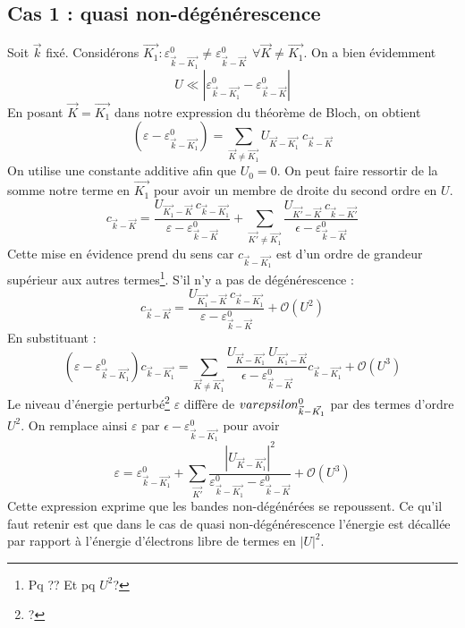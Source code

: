 		\subsection{Cas 1 : quasi non-dégénérescence}
		Soit $\vec{k}$ fixé. Considérons $\vec{K_1} : \varepsilon_{\vec{k}-
		\vec{K_1}}^0 \neq \varepsilon_{\vec{k}-\vec{K}}^0\ \ \forall\vec{K}
		\neq \vec{K_1}$. On a bien évidemment
		\begin{equation}
		U \ll |\varepsilon_{\vec{k}-\vec{K_1}}^0-\varepsilon_{\vec{k}-\vec{K}}^0|
		\end{equation}
		En posant $\vec{K}=\vec{K_1}$ dans notre expression du théorème de 
		Bloch, on obtient
		\begin{equation}
		\left(\varepsilon-\varepsilon_{\vec{k}-\vec{K_1}}^0\right) = 
		\sum_{\vec{K}\neq\vec{K_1}} U_{\vec{K}-\vec{K_1}}\ c_{\vec{k}-\vec{K}}
		\end{equation}
		On utilise une constante additive afin que $U_0=0$. On peut faire 
		ressortir de la somme notre terme en $\vec{K_1}$ pour avoir un membre 
		de droite du second ordre en $U$.
		\begin{equation}
		c_{\vec{k}-\vec{K}} = \dfrac{U_{\vec{K_1}-\vec{K}}\ c_{\vec{k}-\vec{K_1}}}{
		\varepsilon-\varepsilon_{\vec{k}-\vec{K}}^0} + \sum_{\vec{K'}\neq\vec{K_1}}
		\dfrac{U_{\vec{K'}-\vec{K}}\ c_{\vec{k}-\vec{K'}}}{\epsilon - \varepsilon_{\vec{k}-
		\vec{K}}^0}
		\end{equation}
		Cette mise en évidence prend du sens car $c_{\vec{k}-\vec{K_1}}$ est d'un 
		ordre de grandeur supérieur aux autres termes\footnote{Pq ?? Et pq $U^2$?}. 
		S'il n'y a pas de dégénérescence :
		\begin{equation}
		c_{\vec{k}-\vec{K}} = \dfrac{U_{\vec{K_1}-\vec{K}}\ c_{\vec{k}-\vec{K_1}}}{
		\varepsilon-\varepsilon_{\vec{k}-\vec{K}}^0} +\mathcal{O}(U^2)
		\end{equation}
		En substituant :
		\begin{equation}
		\left(\varepsilon-\varepsilon_{\vec{k}-\vec{K_1}}^0\right)c_{\vec{k}-\vec{K_1}} = 
		\sum_{\vec{K}\neq\vec{K_1}} \dfrac{U_{\vec{K}-\vec{K_1}}\ U_{\vec{K_1}-\vec{K
		}}}{\epsilon - \varepsilon_{\vec{k}-\vec{K}}^0}c_{\vec{k}-\vec{K_1}} + 
		\mathcal{O}(U^3)
		\end{equation}
		Le niveau d'énergie perturbé\footnote{?} $\varepsilon$ diffère de 
		$\\varepsilon_{\vec{k}-	\vec{K_1}}^0$ par des termes d'ordre $U^2$. On remplace 
		ainsi $\varepsilon$ par $\epsilon - \varepsilon_{\vec{k}-
		\vec{K_1}}^0$ pour avoir
		\begin{equation}
		\varepsilon =  \varepsilon_{\vec{k}-	\vec{K_1}}^0+ \sum_{\vec{K'}} 
		\dfrac{|U_{\vec{K}-\vec{K_1}}|^2}{\varepsilon_{\vec{k}-\vec{K_1}}^0 - 
		\varepsilon_{\vec{k}-\vec{K}}^0} + \mathcal{O}(U^3)
		\end{equation}
		Cette expression exprime que les bandes non-dégénérées se repoussent. Ce 
		qu'il faut retenir est que dans le cas de quasi non-dégénérescence l'énergie 
		est décallée par rapport à l'énergie d'électrons libre de termes en $|U|^2$.
		
